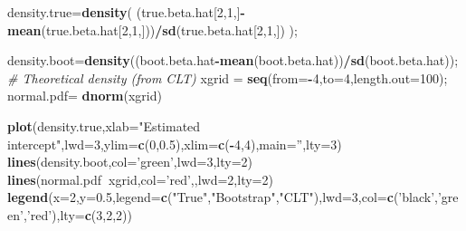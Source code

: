 \documentclass[12pt,]{book}
\newenvironment{Shaded}{\begin{snugshade}}{\end{snugshade}}
\newcommand{\KeywordTok}[1]{\textcolor[rgb]{0.13,0.29,0.53}{\textbf{#1}}}
\newcommand{\DataTypeTok}[1]{\textcolor[rgb]{0.13,0.29,0.53}{#1}}
\newcommand{\DecValTok}[1]{\textcolor[rgb]{0.00,0.00,0.81}{#1}}
\newcommand{\FloatTok}[1]{\textcolor[rgb]{0.00,0.00,0.81}{#1}}
\newcommand{\StringTok}[1]{\textcolor[rgb]{0.31,0.60,0.02}{#1}}
\newcommand{\CommentTok}[1]{\textcolor[rgb]{0.56,0.35,0.01}{\textit{#1}}}
\newcommand{\OperatorTok}[1]{\textcolor[rgb]{0.81,0.36,0.00}{\textbf{#1}}}
\newcommand{\NormalTok}[1]{#1}
\begin{document}
\begin{Shaded}
\begin{Highlighting}[]
\NormalTok{density.true=}\KeywordTok{density}\NormalTok{( (true.beta.hat[}\DecValTok{2}\NormalTok{,}\DecValTok{1}\NormalTok{,]}\OperatorTok{-}\KeywordTok{mean}\NormalTok{(true.beta.hat[}\DecValTok{2}\NormalTok{,}\DecValTok{1}\NormalTok{,]))}\OperatorTok{/}\KeywordTok{sd}\NormalTok{(true.beta.hat[}\DecValTok{2}\NormalTok{,}\DecValTok{1}\NormalTok{,]) );}

\NormalTok{density.boot=}\KeywordTok{density}\NormalTok{((boot.beta.hat}\OperatorTok{-}\KeywordTok{mean}\NormalTok{(boot.beta.hat))}\OperatorTok{/}\KeywordTok{sd}\NormalTok{(boot.beta.hat));}
\CommentTok{# Theoretical density (from CLT)}
\NormalTok{xgrid =}\StringTok{ }\KeywordTok{seq}\NormalTok{(}\DataTypeTok{from=}\OperatorTok{-}\DecValTok{4}\NormalTok{,}\DataTypeTok{to=}\DecValTok{4}\NormalTok{,}\DataTypeTok{length.out=}\DecValTok{100}\NormalTok{);}
\NormalTok{normal.pdf=}\StringTok{ }\KeywordTok{dnorm}\NormalTok{(xgrid)}


\KeywordTok{plot}\NormalTok{(density.true,}\DataTypeTok{xlab=}\StringTok{"Estimated intercept"}\NormalTok{,}\DataTypeTok{lwd=}\DecValTok{3}\NormalTok{,}\DataTypeTok{ylim=}\KeywordTok{c}\NormalTok{(}\DecValTok{0}\NormalTok{,}\FloatTok{0.5}\NormalTok{),}\DataTypeTok{xlim=}\KeywordTok{c}\NormalTok{(}\OperatorTok{-}\DecValTok{4}\NormalTok{,}\DecValTok{4}\NormalTok{),}\DataTypeTok{main=}\StringTok{''}\NormalTok{,}\DataTypeTok{lty=}\DecValTok{3}\NormalTok{)}
\KeywordTok{lines}\NormalTok{(density.boot,}\DataTypeTok{col=}\StringTok{'green'}\NormalTok{,}\DataTypeTok{lwd=}\DecValTok{3}\NormalTok{,}\DataTypeTok{lty=}\DecValTok{2}\NormalTok{)}
\KeywordTok{lines}\NormalTok{(normal.pdf}\OperatorTok{~}\NormalTok{xgrid,}\DataTypeTok{col=}\StringTok{'red'}\NormalTok{,,}\DataTypeTok{lwd=}\DecValTok{2}\NormalTok{,}\DataTypeTok{lty=}\DecValTok{2}\NormalTok{)}
\KeywordTok{legend}\NormalTok{(}\DataTypeTok{x=}\DecValTok{2}\NormalTok{,}\DataTypeTok{y=}\FloatTok{0.5}\NormalTok{,}\DataTypeTok{legend=}\KeywordTok{c}\NormalTok{(}\StringTok{"True"}\NormalTok{,}\StringTok{"Bootstrap"}\NormalTok{,}\StringTok{"CLT"}\NormalTok{),}\DataTypeTok{lwd=}\DecValTok{3}\NormalTok{,}\DataTypeTok{col=}\KeywordTok{c}\NormalTok{(}\StringTok{'black'}\NormalTok{,}\StringTok{'green'}\NormalTok{,}\StringTok{'red'}\NormalTok{),}\DataTypeTok{lty=}\KeywordTok{c}\NormalTok{(}\DecValTok{3}\NormalTok{,}\DecValTok{2}\NormalTok{,}\DecValTok{2}\NormalTok{))}
\end{Highlighting}
\end{Shaded}
\end{document}
